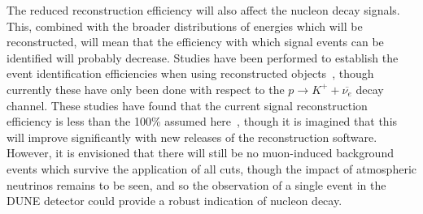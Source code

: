 The reduced reconstruction efficiency will also affect the nucleon decay signals. This, combined with the broader distributions of energies which will be reconstructed, will mean that the efficiency with which signal events can be identified will probably decrease. Studies have been performed to establish the event identification efficiencies when using reconstructed objects~\citep{KevinSeptCollab, AAron_17_02_08, Tingjun_17_02_08, Aaron_17_03_01}, though currently these have only been done with respect to the $p \rightarrow K^{+} + \overline{\nu_{e}}$ decay channel. These studies have found that the current signal reconstruction efficiency is less than the 100\% assumed here~\citep{AAron_17_02_08}, though it is imagined that this will improve significantly with new releases of the reconstruction software. \\

However, it is envisioned that there will still be no muon-induced background events which survive the application of all cuts, though the impact of atmospheric neutrinos remains to be seen, and so the observation of a single event in the DUNE detector could provide a robust indication of nucleon decay. \\
